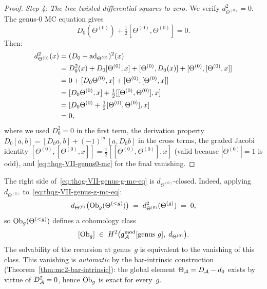 \begin{proof}
\medskip\noindent\emph{Step 4: The tree-twisted differential squares to zero.}
We verify $d_{\Theta^{(0)}}^2 = 0$. The genus-$0$ MC equation gives
\begin{equation}\label{eq:thqg-VII-genus0-mc}
D_0(\Theta^{(0)}) + \tfrac{1}{2}[\Theta^{(0)},\Theta^{(0)}] = 0.
\end{equation}
Then:
\begin{align}
d_{\Theta^{(0)}}^2(x)
&= (D_0 + \operatorname{ad}_{\Theta^{(0)}})^2(x)\notag\\
&= D_0^2(x) + D_0[\Theta^{(0)},x]
 + [\Theta^{(0)}, D_0(x)]
 + [\Theta^{(0)},[\Theta^{(0)},x]]\notag\\
&= 0 + [D_0\Theta^{(0)}, x]
 + [\Theta^{(0)},[\Theta^{(0)},x]]\notag\\
&= [D_0\Theta^{(0)}, x]
 + \tfrac{1}{2}[[\Theta^{(0)},\Theta^{(0)}], x]\notag\\
&= [D_0\Theta^{(0)}
 + \tfrac{1}{2}[\Theta^{(0)},\Theta^{(0)}], x]\notag\\
&= 0,
\label{eq:thqg-VII-d-twisted-squared}
\end{align}
where we used $D_0^2 = 0$ in the first term, the derivation
property $D_0[a,b] = [D_0 a, b] + (-1)^{|a|}[a, D_0 b]$ in
the cross terms, the graded Jacobi identity
$[\Theta^{(0)},[\Theta^{(0)},x]] = \tfrac{1}{2}
[[\Theta^{(0)},\Theta^{(0)}], x]$
(valid because $|\Theta^{(0)}| = 1$ is odd), and
\eqref{eq:thqg-VII-genus0-mc} for the final vanishing.
\end{proof}

\begin{remark}
\label{rem:thqg-VII-obs-cocycle}
The right side of~\eqref{eq:thqg-VII-genus-g-mc-eq} is
$d_{\Theta^{(0)}}$-closed. Indeed, applying
$d_{\Theta^{(0)}}$ to~\eqref{eq:thqg-VII-genus-g-mc-eq}:
\begin{equation}\label{eq:thqg-VII-obs-closed}
d_{\Theta^{(0)}}\bigl(\mathrm{Ob}_g(\Theta^{(<g)})\bigr)
\;=\;
d_{\Theta^{(0)}}^2(\Theta^{(g)})
\;=\; 0,
\end{equation}
so $\mathrm{Ob}_g(\Theta^{(<g)})$ defines a cohomology class
\begin{equation}\label{eq:thqg-VII-obs-class-coh}
[\mathrm{Ob}_g]
\;\in\;
H^2\bigl(\mathfrak{g}_{\mathcal{A}}^{\mathrm{mod}}[\text{genus }g],\; d_{\Theta^{(0)}}\bigr).
\end{equation}
The solvability of the recursion at genus~$g$ is equivalent to
the vanishing of this class. This vanishing is \emph{automatic}
by the bar-intrinsic construction
(Theorem~\ref{thm:mc2-bar-intrinsic}): the global element
$\Theta_{\mathcal{A}} = D_{\mathcal{A}} - d_0$ exists by virtue of $D_{\mathcal{A}}^2 = 0$,
hence $\mathrm{Ob}_g$ is exact for every~$g$.
\end{remark}

